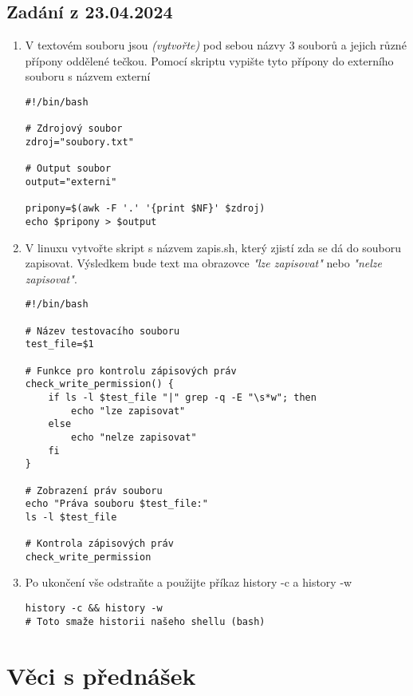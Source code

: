 \documentclass{article}
\begin{document}
\subsection{Zadání z 23.04.2024}
\begin{enumerate}
  \item V textovém souboru jsou \textit{(vytvořte)} pod sebou názvy 3 souborů a jejich různé přípony oddělené tečkou. Pomocí skriptu vypište tyto přípony do externího souboru s názvem externí
\begin{lstlisting}
#!/bin/bash

# Zdrojový soubor
zdroj="soubory.txt"

# Output soubor
output="externi"

pripony=$(awk -F '.' '{print $NF}' $zdroj)
echo $pripony > $output
\end{lstlisting}
  \item V linuxu vytvořte skript s názvem zapis.sh, který zjistí zda se dá do souboru zapisovat. Výsledkem bude text ma obrazovce \textit{"lze zapisovat"} nebo \textit{"nelze zapisovat"}.
    \begin{lstlisting}[caption=zapis.sh musel jsem modifikovat pipe aby se zobrazil ale normálně je to jen ta vertikalní čárka]
#!/bin/bash

# Název testovacího souboru
test_file=$1

# Funkce pro kontrolu zápisových práv
check_write_permission() {
    if ls -l $test_file "|" grep -q -E "\s*w"; then
        echo "lze zapisovat"
    else
        echo "nelze zapisovat"
    fi
}

# Zobrazení práv souboru
echo "Práva souboru $test_file:"
ls -l $test_file

# Kontrola zápisových práv
check_write_permission
\end{lstlisting}
  \item Po ukončení vše odstraňte a použijte příkaz history -c a history -w
\begin{lstlisting}
history -c && history -w 
# Toto smaže historii našeho shellu (bash)
\end{lstlisting}
\end{enumerate}
\section{Věci s přednášek}
\end{document}
